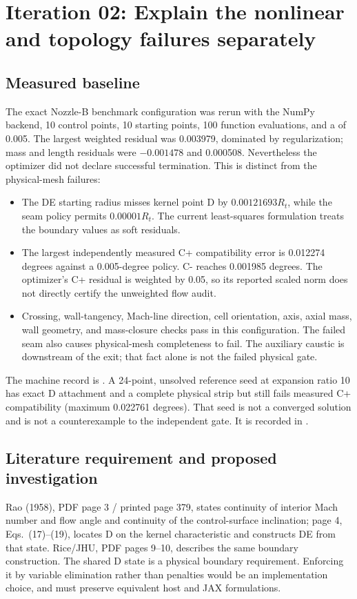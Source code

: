\section{Iteration 02: Explain the nonlinear and topology failures separately}
\subsection{Measured baseline}
The exact Nozzle-B benchmark configuration was rerun with the NumPy backend,
10 control points, 10 starting points, 100 function evaluations, and a
 of 0.005. The largest weighted residual was 0.003979,
dominated by regularization; mass and length residuals were $-0.001478$ and
0.000508. Nevertheless the optimizer did not declare successful termination.
This is distinct from the physical-mesh failures:
\begin{itemize}
\item The DE starting radius misses kernel point D by $0.00121693R_t$,
while the seam policy permits $0.00001R_t$. The current least-squares
formulation treats the boundary values as soft residuals.
\item The largest independently measured C+ compatibility error is
0.012274 degrees against a 0.005-degree policy. C- reaches 0.001985 degrees.
The optimizer's C+ residual is weighted by 0.05, so its reported scaled norm
does not directly certify the unweighted flow audit.
\item Crossing, wall-tangency, Mach-line direction, cell orientation, axis,
axial mass, wall geometry, and mass-closure checks pass in this configuration.
The failed seam also causes physical-mesh completeness to fail. The auxiliary
caustic is downstream of the exit; that fact alone is not the failed physical gate.
\end{itemize}
The machine record is . A 24-point,
unsolved reference seed at expansion ratio 10 has exact D attachment and a
complete physical strip but still fails measured C+ compatibility (maximum
0.022761 degrees). That seed is not a converged solution and is not a
counterexample to the independent gate. It is recorded in
.

\subsection{Literature requirement and proposed investigation}
Rao (1958), PDF page 3 / printed page 379, states continuity of interior Mach
number and flow angle and continuity of the control-surface inclination; page 4,
Eqs.~(17)--(19), locates D on the kernel characteristic and constructs DE from
that state. Rice/JHU, PDF pages 9--10, describes the same boundary construction.
The shared D state is a physical boundary requirement. Enforcing it by variable
elimination rather than penalties would be an implementation choice, and must
preserve equivalent host and JAX formulations.


